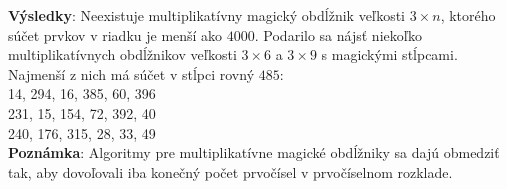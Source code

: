 \documentclass[12pt]{article}
\begin{document}
\textbf{Výsledky}: Neexistuje multiplikatívny magický obdĺžnik veľkosti $3 \times n$, ktorého súčet prvkov v riadku je menší ako $4000$. Podarilo sa nájsť niekoľko multiplikatívnych obdĺžnikov veľkosti $3 \times 6$ a $3 \times 9$ s magickými stĺpcami. Najmenší z nich má súčet v stĺpci rovný $485$: \\
14, 294, 16, 385, 60, 396 \\
231, 15, 154, 72, 392, 40 \\
240, 176, 315, 28, 33, 49 \\

\textbf{Poznámka}: Algoritmy pre multiplikatívne magické obdĺžniky sa dajú obmedziť tak, aby dovoľovali iba konečný počet prvočísel v prvočíselnom rozklade.
\end{document}
